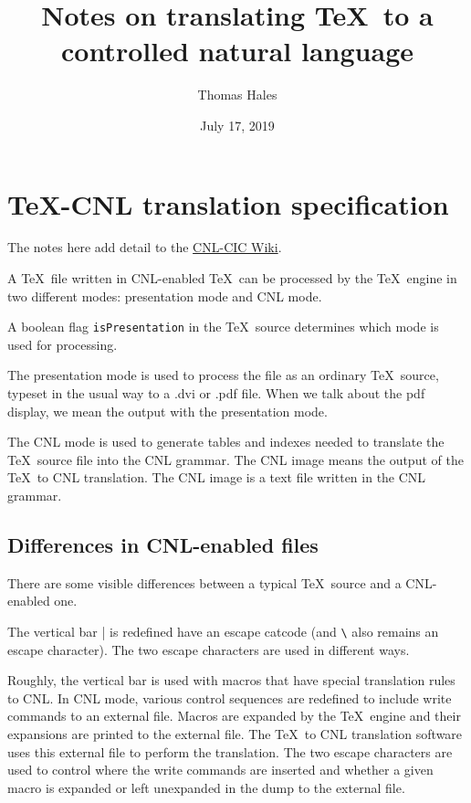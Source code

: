 \documentclass[12pt]{amsart}
\title{Notes on translating \TeX\ to a controlled natural language}
\date{July 17, 2019}                                           %
\author{Thomas Hales}
\begin{document}
\maketitle



\section{\TeX-CNL translation specification}

The notes here add detail to the
 \href{https://github.com/formalabstracts/CNL-CIC/wiki/Conversion-from-LaTeX}{CNL-CIC Wiki}.

A \TeX\ file written in CNL-enabled \TeX\ can be processed 
by the \TeX\ engine in
two different modes: presentation mode and CNL mode.

A boolean flag {\tt isPresentation} in the \TeX\ source determines
which mode is used for processing.

The presentation mode is used to process the file as an ordinary
\TeX\ source, typeset in the usual way to a .dvi or .pdf file.  When
we talk about the pdf display, we mean the output with the
presentation mode.

The CNL mode is used to generate tables and indexes needed to
translate the \TeX\ source file into the CNL grammar.  The CNL image
means the output of the \TeX\ to CNL translation.  The CNL image is a
text file written in the CNL grammar.


\subsection{Differences in CNL-enabled files}

There are some visible differences between a typical \TeX\ source
and a CNL-enabled one.

The vertical bar | is redefined have an escape catcode (and \verb!\!
also remains an escape character).  The two escape characters are used
in different ways.  

Roughly, the vertical bar is used with macros that
have special translation rules to CNL.  In CNL mode, various control
sequences are redefined to include write commands to an external
file.  Macros are expanded by the \TeX\ engine and their expansions
are printed to the external file.  The \TeX\ to CNL translation software
uses this external file to perform the translation.  The two escape characters
are used to control where the write commands are inserted and whether
a given macro is expanded or left unexpanded in the dump to the external
file.  
\end{document}
